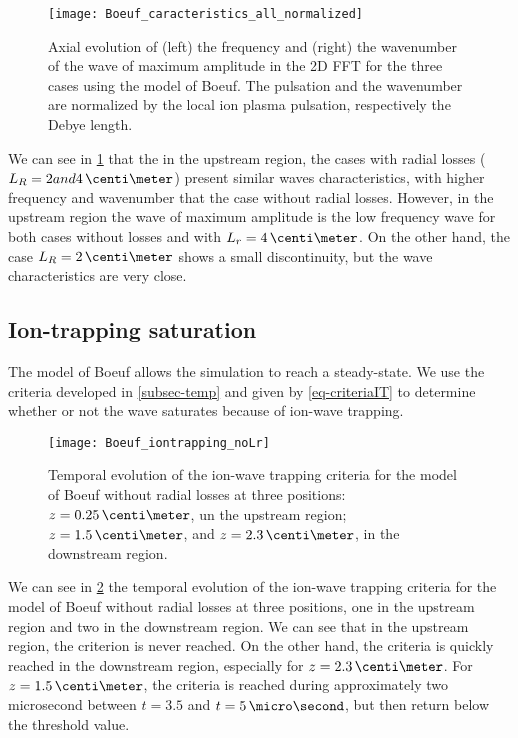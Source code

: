 \begin{figure}[hbtp]
  \centering
  \texttt{[image: Boeuf\_caracteristics\_all\_normalized]}
  \caption{Axial evolution of (left) the frequency and (right) the wavenumber of the wave of maximum amplitude in the \ac{2D} \ac{FFT} for the three cases using the model of Boeuf. The pulsation and the wavenumber are normalized by the local ion plasma pulsation, respectively the Debye length.}
  \label{fig-axial_maxwave_normalized}
\end{figure}

We can see in \cref{fig-axial_maxwave_normalized} that the in the upstream region, the cases with radial losses ($L_R=2 and 4\,\centi\meter$) present similar waves characteristics, with higher frequency and wavenumber that the case without radial losses.
However, in the upstream region the wave of maximum amplitude is the low frequency wave for both cases without losses and with $L_r=4\,\centi\meter$.
On the other hand, the case $L_R=2\,\centi\meter$ shows a small discontinuity, but the wave characteristics are very close.


\subsection{Ion-trapping saturation } \label{subsec-boeuf_iontrapping}

The model of Boeuf allows the simulation to reach a steady-state.
We use the criteria developed in \cref{subsec-temp} and given by \cref{eq-criteriaIT} to determine whether or not the wave saturates because of ion-wave trapping.

\begin{figure}[hbtp]
  \centering
  \texttt{[image: Boeuf\_iontrapping\_noLr]}
  \caption{Temporal evolution of the ion-wave trapping criteria for the model of Boeuf without radial losses at three positions\string: $z=0.25\,\centi\meter$, un the upstream region; $z=1.5\,\centi\meter$, and $z=2.3\,\centi\meter$, in the downstream region.}
  \label{fig-ion-trap_temp_noLr}
\end{figure}

We can see in \cref{fig-ion-trap_temp_noLr} the temporal evolution of the ion-wave trapping criteria for the model of Boeuf without radial losses at three positions, one in the upstream region and two in the downstream region.
We can see that in the upstream region, the criterion is never reached.
On the other hand, the criteria is quickly reached in the downstream region, especially for $z=2.3\,\centi\meter$.
For $z=1.5\,\centi\meter$, the criteria is reached during approximately two microsecond between $t=3.5$ and $t=5\,\micro\second$, but then return below the threshold value.

